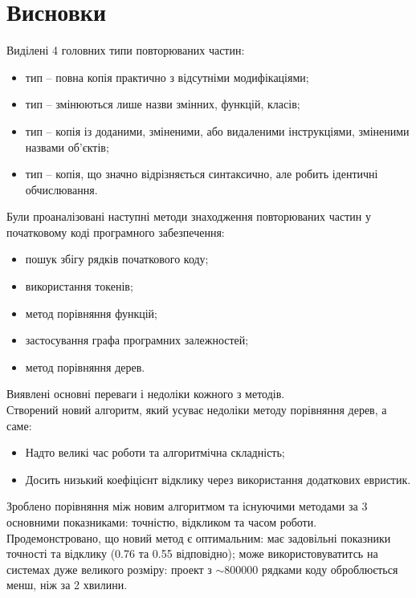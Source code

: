 \documentclass[a4paper, 14pt]{article}
\newcommand{\RNum}[1]{\uppercase\expandafter{\romannumeral #1\relax}}
\begin{document}
\section*{Висновки}
Виділені 4 головних типи повторюваних частин:
\begin{itemize}
\item \RNum{1} тип -- повна копія практично з відсутніми модифікаціями;
\item \RNum{2} тип -- змінюються лише назви змінних, функцій, класів;
\item \RNum{3} тип -- копія із доданими, зміненими, або видаленими інструкціями, зміненими назвами об'єктів;
\item \RNum{4} тип -- копія, що значно відрізняється синтаксично, але робить ідентичні обчислювання.
\end{itemize}
Були проаналізовані наступні методи знаходження повторюваних частин у початковому коді програмного забезпечення:
\begin{itemize}
\item пошук збігу рядків початкового коду;
\item використання токенів;
\item метод порівняння функцій;
\item застосування графа програмних залежностей;
\item метод порівняння дерев.
\end{itemize} 
Виявлені основні переваги і недоліки кожного з методів. \\ 
Створений новий алгоритм, який усуває недоліки методу порівняння дерев, а саме:
\begin{itemize}
\item Надто великі час роботи та алгоритмічна складність;
\item Досить низький коефіцієнт відклику через використання додаткових евристик.
\end{itemize}
Зроблено порівняння між новим алгоритмом та існуючими методами за 3 основними показниками: точністю, відкликом та часом роботи. \\
Продемонстровано, що новий метод є оптимальним: має задовільні показники точності та відклику (0.76 та 0.55 відповідно); може використовуватитсь на системах дуже великого розміру: проект з $\sim$800000 рядками коду оброблюється менш, ніж за 2 хвилини.
\newpage
{}
\printbibliography[title={список використаних джерел}]
\end{document}
